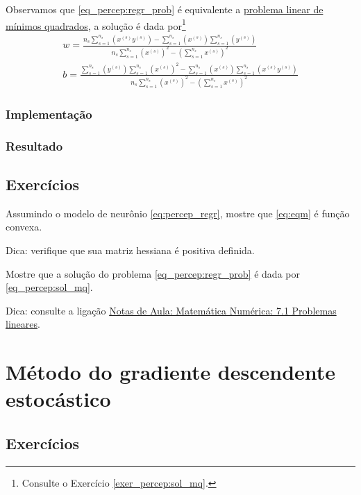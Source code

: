 Observamos que \eqref{eq_percep:regr_prob} é equivalente a \href{https://notaspedrok.com.br/notas/MatematicaNumerica/cap_ajuste_sec_prob_lin.html}{problema linear de mínimos quadrados}, a solução é dada por\footnote{Consulte o Exercício \ref{exer_percep:sol_mq}.}
\begin{gather}\label{eq_percep:sol_mq}
  w = \frac{n_s\sum_{s=1}^{n_s}\left(x^{(s)}y^{(s)}\right)-\sum_{s=1}^{n_s}\left(x^{(s)}\right)\sum_{s=1}^{n_s}\left(y^{(s)}\right)}{n_s\sum_{s=1}^{n_s}\left(x^{(s)}\right)^2-\left(\sum_{s=1}^{n_s}x^{(s)}\right)^2}\\
  b = \frac{\sum_{s=1}^{n_s}\left(y^{(s)}\right)\sum_{s=1}^{n_s}\left(x^{(s)}\right)^2-\sum_{s=1}^{n_s}\left(x^{(s)}\right)\sum_{s=1}^{n_s}\left(x^{(s)}y^{(s)}\right)}{n_s\sum_{s=1}^{n_s}\left(x^{(s)}\right)^2-\left(\sum_{s=1}^{n_s}x^{(s)}\right)^2}
\end{gather}

\subsubsection{Implementação}

\emconstrucao

\subsubsection{Resultado}

\emconstrucao

\subsection{Exercícios}

\begin{exer}\label{exer:eqm_convexa}
  Assumindo o modelo de neurônio \eqref{eq:percep_regr}, mostre que \eqref{eq:eqm} é função convexa.
\end{exer}
\begin{resp}
  Dica: verifique que sua matriz hessiana é positiva definida.
\end{resp}

\begin{exer}\label{exer_percep:sol_mq}
  Mostre que a solução do problema \eqref{eq_percep:regr_prob} é dada por \eqref{eq_percep:sol_mq}.
\end{exer}
\begin{resp}
  Dica: consulte a ligação \href{https://notaspedrok.com.br/notas/MatematicaNumerica/cap_ajuste_sec_prob_lin.html}{Notas de Aula: Matemática Numérica: 7.1 Problemas lineares}.
\end{resp}

\emconstrucao

\section{Método do gradiente descendente estocástico}

\emconstrucao

\subsection{Exercícios}

\emconstrucao

